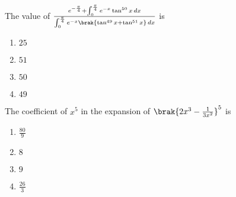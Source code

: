 \item The value of $\frac{e^{-\frac{\pi}{4}} + \int_0^{\frac{\pi}{4}} e^{-x} \tan^{50}x \, dx}{\int_0^{\frac{\pi}{4}} e^{-x} \brak{ \tan^{49}x + \tan^{51}x } \, dx}$ is\hfill{}

\begin{multicols}{4}
\begin{enumerate}
\item $25$
\item $51$
\item $50$
\item $49$
\end{enumerate}
\end{multicols}

\item The coefficient of $x^5$ in the expansion of ${\brak{2x^3-\frac{1}{3x^2}}}^5$ is\hfill{}

\begin{multicols}{4}
\begin{enumerate}
\item $\frac{80}{9}$
\item $8$
\item $9$
\item $\frac{26}{3}$
\end{enumerate}
\end{multicols}



